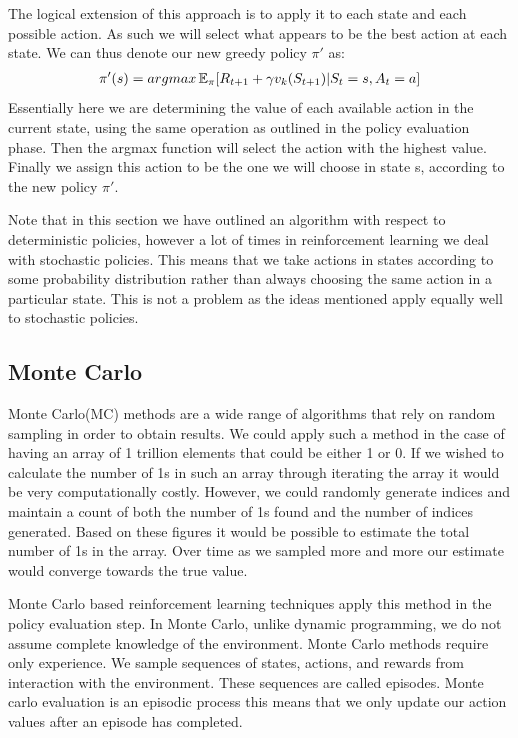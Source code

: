 The logical extension of this approach is to apply it to each state and each possible action.
As such we will select what appears to be the best action at each state.
We can thus denote our new greedy policy $\pi'$ as:
\begin{align}
    \pi'(s) = argmax\operatorname{\mathbb{E}}_{\pi}\lbrack R_{t+1} + \gamma v_k(S_{t+1}) | S_t = s, A_t = a\rbrack
\end{align}
Essentially here we are determining the value of each available action in the current state, using the same operation
as outlined in the policy evaluation phase.
Then the argmax function will select the action with the highest value.
Finally we assign this action to be the one we will choose in state s, according to the new policy $\pi'$.

Note that in this section we have outlined an algorithm with respect to deterministic policies,
however a lot of times in reinforcement learning we deal with stochastic policies.
This means that we take actions in states according to some probability distribution rather than always choosing
the same action in a particular state.
This is not a problem as the ideas mentioned apply equally well to stochastic policies.

\subsection{Monte Carlo}\label{subsec:mc}
Monte Carlo(MC) methods are a wide range of algorithms that rely on random sampling in order to obtain results.
We could apply such a method in the case of having an array of 1 trillion elements that could be
either 1 or 0.
If we wished to calculate the number of 1s in such an array through iterating the array it would
be very computationally costly.
However, we could randomly generate indices and maintain a count of both the number of 1s found
and the number of indices generated.
Based on these figures it would be possible to estimate the total number of 1s in the array.
Over time as we sampled more and more our estimate would converge towards the true value.

Monte Carlo based reinforcement learning techniques apply this method in the policy evaluation step.
In Monte Carlo, unlike dynamic programming, we do not assume complete knowledge of the environment.
Monte Carlo methods require only experience.
We sample sequences of states, actions, and rewards from interaction with the
environment\citep{sutton1998reinforcement}.
These sequences are called episodes.
Monte carlo evaluation is an episodic process this means that we only update our action values after an episode
has completed.

